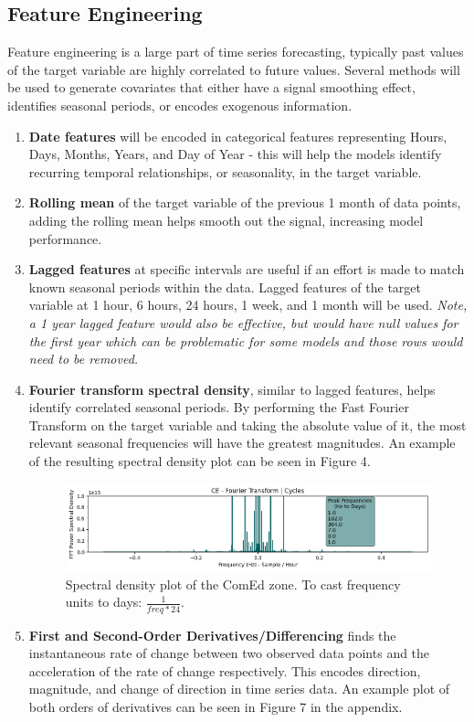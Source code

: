 \documentclass[sigconf]{acmart}
\begin{document}
    \subsection{Feature Engineering}
  Feature engineering is a large part of time series forecasting, typically past values of the target variable are highly correlated to future values. Several methods will be used to generate covariates that either have a signal smoothing effect, identifies seasonal periods, or encodes exogenous information.
  \begin{enumerate}
  \item \textbf{Date features} will be encoded in categorical features representing Hours, Days, Months, Years, and Day of Year - this will help the models identify recurring temporal relationships, or seasonality, in the target variable.
  \item \textbf{Rolling mean} of the target variable of the previous 1 month of data points, adding the rolling mean helps smooth out the signal, increasing model performance. 
  \item \textbf{Lagged features} at specific intervals are useful if an effort is made to match known seasonal periods within the data. Lagged features of the target variable at 1 hour, 6 hours, 24 hours, 1 week, and 1 month will be used. \textit{Note, a 1 year lagged feature would also be effective, but would have null values for the first year which can be problematic for some models and those rows would need to be removed.}
  \item \textbf{Fourier transform spectral density}, similar to lagged features, helps identify correlated seasonal periods. By performing the Fast Fourier Transform on the target variable and taking the absolute value of it, the most relevant seasonal frequencies will have the greatest magnitudes. An example of the resulting spectral density plot can be seen in Figure 4.
  
    \begin{figure}[hbt!]
    \includegraphics[width=\linewidth]{Images/FFT_Plot.png}
    \caption{Spectral density plot of the ComEd zone. To cast frequency units to days: $\frac{1}{freq*24}$.}
    \Description{}
    \label{fig:fft}
  \end{figure}
  
  \item \textbf{First and Second-Order Derivatives/Differencing} finds the instantaneous rate of change between two observed data points and the acceleration of the rate of change respectively. This encodes direction, magnitude, and change of direction in time series data. An example plot of both orders of derivatives can be seen in Figure 7 in the appendix.
\end{enumerate}
\end{document}
